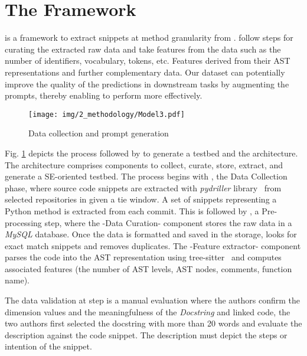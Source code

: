 \section{The \snipgen Framework}\label{sec:methodology}

\snipgen is a framework to extract snippets at method granularity from \github. \snipgen follow steps for curating the extracted raw data and take features from the data such as the number of identifiers, vocabulary, tokens, etc. Features derived from their AST representations and further complementary data. Our dataset can potentially improve the quality of the predictions in downstream tasks by augmenting the prompts, thereby enabling \llms to perform more effectively.


\begin{figure}[ht]
		\centering
		\texttt{[image: img/2\_methodology/Model3.pdf]}
		\caption{\snipgen Data collection and prompt generation }
        \label{fig:collection}
\end{figure}

Fig. \ref{fig:collection} depicts the process followed by \snipgen to generate a testbed and the \snipgen architecture. The \snipgen architecture comprises components to collect, curate, store, extract, and generate a SE-oriented testbed. The process begins with , the Data Collection phase, where source code snippets are extracted with \textit{pydriller} library~\cite{pydriller} from selected repositories in \github given a tie window. A set of snippets representing a Python method is extracted from each commit. This is followed by , a Pre-processing step, where the -Data Curation- \snipgen component stores the raw data in a \textit{MySQL} database. Once the data is formatted and saved in the storage, \snipgen looks for exact match snippets and removes duplicates. The -Feature extractor- component parses the code into the AST representation using tree-sitter~\cite{tree_sitter} and computes associated features (\ie the number of AST levels, AST nodes, comments, function name).

The data validation at step  is a manual evaluation where the authors confirm the dimension values and the meaningfulness of the \textit{Docstring} and linked code, the two authors first selected the docstring with more than 20 words and evaluate the description against the code snippet. The description must depict the steps or intention of the snippet.

